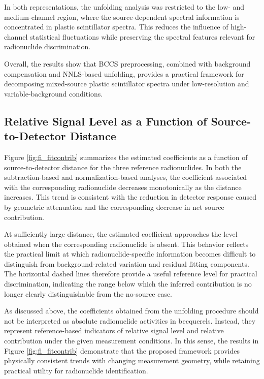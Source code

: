 \documentclass[fleqn, 10pt]{wlscirep}
\begin{document}
In both representations, the unfolding analysis was restricted to the low- and medium-channel region, where the source-dependent spectral information is concentrated in plastic scintillator spectra. This reduces the influence of high-channel statistical fluctuations while preserving the spectral features relevant for radionuclide discrimination.

Overall, the results show that BCCS preprocessing, combined with background compensation and NNLS-based unfolding, provides a practical framework for decomposing mixed-source plastic scintillator spectra under low-resolution and variable-background conditions.


\subsection*{Relative Signal Level as a Function of Source-to-Detector Distance}

Figure \ref{fig:fi_fitcontrib} summarizes the estimated coefficients as a function of source-to-detector distance for the three reference radionuclides. In both the subtraction-based and normalization-based analyses, the coefficient associated with the corresponding radionuclide decreases monotonically as the distance increases. This trend is consistent with the reduction in detector response caused by geometric attenuation and the corresponding decrease in net source contribution.

At sufficiently large distance, the estimated coefficient approaches the level obtained when the corresponding radionuclide is absent. This behavior reflects the practical limit at which radionuclide-specific information becomes difficult to distinguish from background-related variation and residual fitting components. The horizontal dashed lines therefore provide a useful reference level for practical discrimination, indicating the range below which the inferred contribution is no longer clearly distinguishable from the no-source case.

As discussed above, the coefficients obtained from the unfolding procedure should not be interpreted as absolute radionuclide activities in becquerels. Instead, they represent reference-based indicators of relative signal level and relative contribution under the given measurement conditions. In this sense, the results in Figure \ref{fig:fi_fitcontrib} demonstrate that the proposed framework provides physically consistent trends with changing measurement geometry, while retaining practical utility for radionuclide identification.
\end{document}
